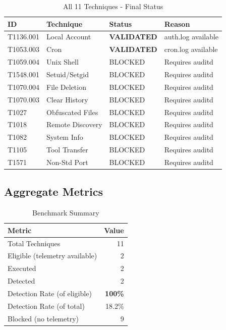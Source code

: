 \documentclass[11pt,a4paper]{article}
\begin{document}
\begin{table}[H]
    \centering
    \caption{All 11 Techniques - Final Status}
    \begin{tabular}{llll}
        \toprule
        \textbf{ID} & \textbf{Technique} & \textbf{Status} & \textbf{Reason} \\
        \midrule
        T1136.001 & Local Account & \textbf{VALIDATED} & auth.log available \\
        T1053.003 & Cron & \textbf{VALIDATED} & cron.log available \\
        \midrule
        T1059.004 & Unix Shell & BLOCKED & Requires auditd \\
        T1548.001 & Setuid/Setgid & BLOCKED & Requires auditd \\
        T1070.004 & File Deletion & BLOCKED & Requires auditd \\
        T1070.003 & Clear History & BLOCKED & Requires auditd \\
        T1027 & Obfuscated Files & BLOCKED & Requires auditd \\
        T1018 & Remote Discovery & BLOCKED & Requires auditd \\
        T1082 & System Info & BLOCKED & Requires auditd \\
        T1105 & Tool Transfer & BLOCKED & Requires auditd \\
        T1571 & Non-Std Port & BLOCKED & Requires auditd \\
        \bottomrule
    \end{tabular}
\end{table}

\subsection{Aggregate Metrics}

\begin{table}[H]
    \centering
    \caption{Benchmark Summary}
    \begin{tabular}{lr}
        \toprule
        \textbf{Metric} & \textbf{Value} \\
        \midrule
        Total Techniques & 11 \\
        Eligible (telemetry available) & 2 \\
        Executed & 2 \\
        Detected & 2 \\
        Detection Rate (of eligible) & \textbf{100\%} \\
        Detection Rate (of total) & 18.2\% \\
        Blocked (no telemetry) & 9 \\
        \bottomrule
    \end{tabular}
\end{table}
\end{document}
